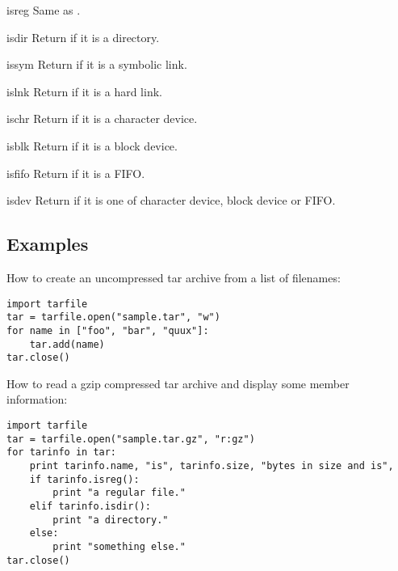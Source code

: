 \begin{methoddesc}{isreg}{}
    Same as .
\end{methoddesc}

\begin{methoddesc}{isdir}{}
    Return  if it is a directory.
\end{methoddesc}

\begin{methoddesc}{issym}{}
    Return  if it is a symbolic link.
\end{methoddesc}

\begin{methoddesc}{islnk}{}
    Return  if it is a hard link.
\end{methoddesc}

\begin{methoddesc}{ischr}{}
    Return  if it is a character device.
\end{methoddesc}

\begin{methoddesc}{isblk}{}
    Return  if it is a block device.
\end{methoddesc}

\begin{methoddesc}{isfifo}{}
    Return  if it is a FIFO.
\end{methoddesc}

\begin{methoddesc}{isdev}{}
    Return  if it is one of character device, block device or FIFO.
\end{methoddesc}


\subsection{Examples \label{tar-examples}}

How to create an uncompressed tar archive from a list of filenames:
\begin{verbatim}
import tarfile
tar = tarfile.open("sample.tar", "w")
for name in ["foo", "bar", "quux"]:
    tar.add(name)
tar.close()
\end{verbatim}

How to read a gzip compressed tar archive and display some member information:
\begin{verbatim}
import tarfile
tar = tarfile.open("sample.tar.gz", "r:gz")
for tarinfo in tar:
    print tarinfo.name, "is", tarinfo.size, "bytes in size and is",
    if tarinfo.isreg():
        print "a regular file."
    elif tarinfo.isdir():
        print "a directory."
    else:
        print "something else."
tar.close()
\end{verbatim}

